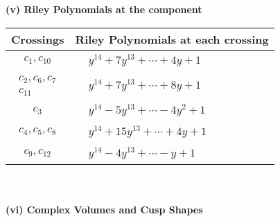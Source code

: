 \documentclass[1p]{elsarticle_modified}
\theoremstyle{definition}
\begin{document}
\newpage\renewcommand{\arraystretch}{1}
\flushleft \textbf{(v) Riley Polynomials at the component}\newline \\
\begin{tabular}{m{50pt}|m{274pt}}
Crossings & \hspace{64pt}Riley Polynomials at each crossing \\
\hline $$\begin{aligned}c_{1},c_{10}\end{aligned}$$&$\begin{aligned}
&y^{14}+7 y^{13}+\cdots+4 y+1
\end{aligned}$\\
\hline $$\begin{aligned}c_{2},c_{6},c_{7}\\c_{11}\end{aligned}$$&$\begin{aligned}
&y^{14}+7 y^{13}+\cdots+8 y+1
\end{aligned}$\\
\hline $$\begin{aligned}c_{3}\end{aligned}$$&$\begin{aligned}
&y^{14}-5 y^{13}+\cdots-4 y^2+1
\end{aligned}$\\
\hline $$\begin{aligned}c_{4},c_{5},c_{8}\end{aligned}$$&$\begin{aligned}
&y^{14}+15 y^{13}+\cdots+4 y+1
\end{aligned}$\\
\hline $$\begin{aligned}c_{9},c_{12}\end{aligned}$$&$\begin{aligned}
&y^{14}-4 y^{13}+\cdots- y+1
\end{aligned}$\\
\hline
\end{tabular}\\~\\
\newpage\flushleft \textbf{(vi) Complex Volumes and Cusp Shapes}
\end{document}
